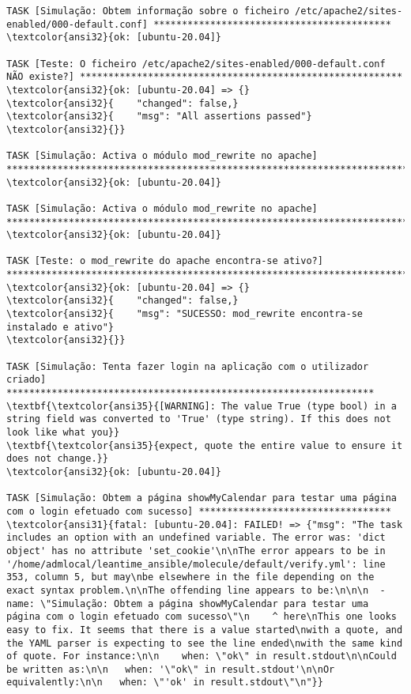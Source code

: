 \documentclass{scrartcl}
\begin{document}
\begin{Verbatim}
TASK [Simulação: Obtem informação sobre o ficheiro /etc/apache2/sites-enabled/000-default.conf] ******************************************
\textcolor{ansi32}{ok: [ubuntu-20.04]}

TASK [Teste: O ficheiro /etc/apache2/sites-enabled/000-default.conf NÃO existe?] *********************************************************
\textcolor{ansi32}{ok: [ubuntu-20.04] => {}
\textcolor{ansi32}{    "changed": false,}
\textcolor{ansi32}{    "msg": "All assertions passed"}
\textcolor{ansi32}{}}

TASK [Simulação: Activa o módulo mod_rewrite no apache] **********************************************************************************
\textcolor{ansi32}{ok: [ubuntu-20.04]}

TASK [Simulação: Activa o módulo mod_rewrite no apache] **********************************************************************************
\textcolor{ansi32}{ok: [ubuntu-20.04]}

TASK [Teste: o mod_rewrite do apache encontra-se ativo?] *********************************************************************************
\textcolor{ansi32}{ok: [ubuntu-20.04] => {}
\textcolor{ansi32}{    "changed": false,}
\textcolor{ansi32}{    "msg": "SUCESSO: mod_rewrite encontra-se instalado e ativo"}
\textcolor{ansi32}{}}

TASK [Simulação: Tenta fazer login na aplicação com o utilizador criado] *****************************************************************
\textbf{\textcolor{ansi35}{[WARNING]: The value True (type bool) in a string field was converted to 'True' (type string). If this does not look like what you}}
\textbf{\textcolor{ansi35}{expect, quote the entire value to ensure it does not change.}}
\textcolor{ansi32}{ok: [ubuntu-20.04]}

TASK [Simulação: Obtem a página showMyCalendar para testar uma página com o login efetuado com sucesso] **********************************
\textcolor{ansi31}{fatal: [ubuntu-20.04]: FAILED! => {"msg": "The task includes an option with an undefined variable. The error was: 'dict object' has no attribute 'set_cookie'\n\nThe error appears to be in '/home/admlocal/leantime_ansible/molecule/default/verify.yml': line 353, column 5, but may\nbe elsewhere in the file depending on the exact syntax problem.\n\nThe offending line appears to be:\n\n\n  - name: \"Simulação: Obtem a página showMyCalendar para testar uma página com o login efetuado com sucesso\"\n    ^ here\nThis one looks easy to fix. It seems that there is a value started\nwith a quote, and the YAML parser is expecting to see the line ended\nwith the same kind of quote. For instance:\n\n    when: \"ok\" in result.stdout\n\nCould be written as:\n\n   when: '\"ok\" in result.stdout'\n\nOr equivalently:\n\n   when: \"'ok' in result.stdout\"\n"}}


\end{Verbatim}
\end{document}
